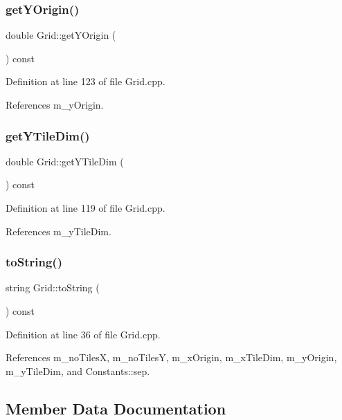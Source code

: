 \subsubsection{getYOrigin()}
{\footnotesize\ttfamily double Grid\+::get\+Y\+Origin (\begin{DoxyParamCaption}{ }\end{DoxyParamCaption}) const}



Definition at line 123 of file Grid.\+cpp.



References m\+\_\+y\+Origin.

\mbox{\label{class_grid_aedfe477f5be79a375bd64a4d21765918}} 
\subsubsection{getYTileDim()}
{\footnotesize\ttfamily double Grid\+::get\+Y\+Tile\+Dim (\begin{DoxyParamCaption}{ }\end{DoxyParamCaption}) const}



Definition at line 119 of file Grid.\+cpp.



References m\+\_\+y\+Tile\+Dim.

\mbox{\label{class_grid_ad48d195b5e333a94a3a14d6395252b2a}} 
\subsubsection{toString()}
{\footnotesize\ttfamily string Grid\+::to\+String (\begin{DoxyParamCaption}{ }\end{DoxyParamCaption}) const}



Definition at line 36 of file Grid.\+cpp.



References m\+\_\+no\+TilesX, m\+\_\+no\+TilesY, m\+\_\+x\+Origin, m\+\_\+x\+Tile\+Dim, m\+\_\+y\+Origin, m\+\_\+y\+Tile\+Dim, and Constants\+::sep.



\subsection{Member Data Documentation}
\mbox{\label{class_grid_ac3caf5a02341f2cfb809c90bd5deeee3}} 
